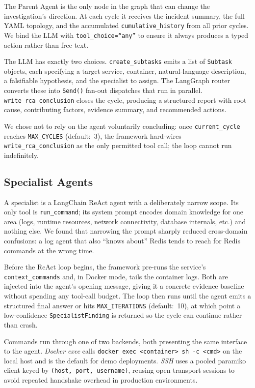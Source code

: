 \documentclass[conference]{IEEEtran}
\begin{document}
The Parent Agent is the only node in the graph that can change the
investigation's direction. At each cycle it receives the incident
summary, the full YAML topology, and the accumulated
\texttt{cumulative\_history} from all prior cycles. We bind the LLM
with \texttt{tool\_choice=``any''} to ensure it always produces a
typed action rather than free text.

The LLM has exactly two choices. \texttt{create\_subtasks} emits a
list of \texttt{Subtask} objects, each specifying a target service,
container, natural-language description, a falsifiable hypothesis, and
the specialist to assign. The LangGraph router converts these into
\texttt{Send()} fan-out dispatches that run in parallel.
\texttt{write\_rca\_conclusion} closes the cycle, producing a
structured report with root cause, contributing factors, evidence
summary, and recommended actions.

We chose not to rely on the agent voluntarily concluding: once
\texttt{current\_cycle} reaches \texttt{MAX\_CYCLES} (default:~3),
the framework hard-wires \texttt{write\_rca\_conclusion} as the only
permitted tool call; the loop cannot run indefinitely.

\subsection{Specialist Agents}

A specialist is a LangChain ReAct agent with a deliberately narrow
scope. Its only tool is \texttt{run\_command}; its system prompt
encodes domain knowledge for one area (logs, runtime resources,
network connectivity, database internals, etc.) and nothing else.
We found that narrowing the prompt sharply reduced
cross-domain confusions: a log agent that also ``knows about''
Redis tends to reach for Redis commands at the wrong time.

Before the ReAct loop begins, the framework pre-runs the service's
\texttt{context\_commands} and, in Docker mode, tails the container
logs. Both are injected into the agent's opening message, giving it
a concrete evidence baseline without spending any tool-call budget.
The loop then runs until the agent emits a structured final answer or
hits \texttt{MAX\_ITERATIONS} (default:~10), at which point a
low-confidence \texttt{SpecialistFinding} is returned so the cycle
can continue rather than crash.

Commands run through one of two backends, both presenting the same
interface to the agent. \textit{Docker exec} calls
\texttt{docker exec <container> sh -c <cmd>} on the local host and
is the default for demo deployments. \textit{SSH} uses a pooled
paramiko client keyed by \texttt{(host, port, username)}, reusing
open transport sessions to avoid repeated handshake overhead in
production environments.
\end{document}
